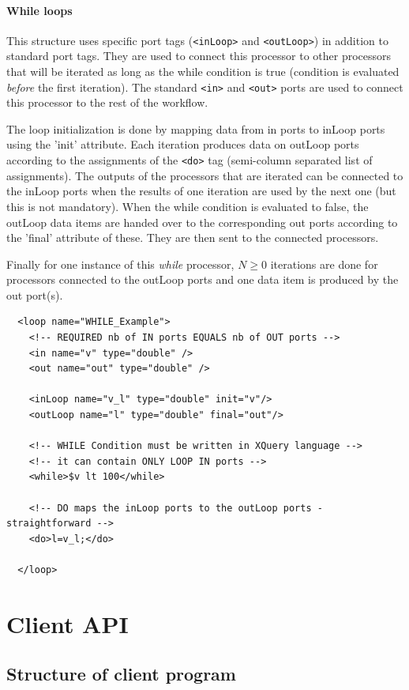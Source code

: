 \begin{itemize}
\paragraph{While loops}  This structure uses specific port tags (\texttt{<inLoop>} and \texttt{<outLoop>}) in addition to standard port tags. They are used to connect this processor to other processors that will be iterated as long as the while condition is true (condition is evaluated \textit{before} the first iteration). The standard \texttt{<in>} and \texttt{<out>} ports are used to connect this processor to the rest of the workflow.

The loop initialization is done by mapping data from in ports to inLoop ports using the 'init' attribute. Each iteration produces data on outLoop ports according to the assignments of the \texttt{<do>} tag (semi-column separated list of assignments). The outputs of the processors that are iterated can be connected to the inLoop ports when the results of one iteration are used by the next one (but this is not mandatory). When the while condition is evaluated to false, the outLoop data items are handed over to the corresponding out ports according to the 'final' attribute of these. They are then sent to the connected processors.

Finally for one instance of this \textit{while} processor, $N \geq 0$ iterations are done for processors connected to the outLoop ports and one data item is produced by the out port(s).

\begin{verbatim}
  <loop name="WHILE_Example">
    <!-- REQUIRED nb of IN ports EQUALS nb of OUT ports -->
    <in name="v" type="double" />
    <out name="out" type="double" />

    <inLoop name="v_l" type="double" init="v"/>
    <outLoop name="l" type="double" final="out"/>

    <!-- WHILE Condition must be written in XQuery language -->
    <!-- it can contain ONLY LOOP IN ports -->
    <while>$v lt 100</while>

    <!-- DO maps the inLoop ports to the outLoop ports - straightforward -->
    <do>l=v_l;</do>

  </loop>
\end{verbatim}

\section{Client API}

\subsection{Structure of client program}
\label{sec:client_prg}


\end{itemize}
